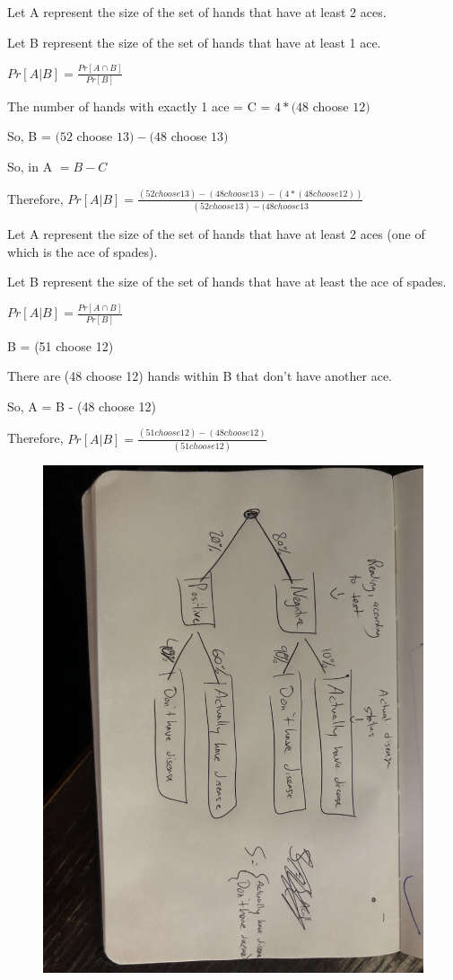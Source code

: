 \documentclass{6042}
\author{Ian Miller}
\begin{document}



Let A represent the size of the set of hands that have at least 2 aces.

Let B represent the size of the set of hands that have at least 1 ace.

$Pr[A | B] = \frac{Pr[A \cap B]}{Pr[B]}$

The number of hands with exactly 1 ace = C = $4 * (48$ choose $12)$

So, B = $(52$ choose $13) - (48$ choose $13)$

So, in A $ = B - C$

Therefore, $Pr[A | B] = \frac{(52 choose 13) - (48 choose 13) - (4 * (48 choose 12))}{(52 choose 13) - (48 choose 13}$





Let A represent the size of the set of hands that have at least 2 aces (one of which is the ace of spades).

Let B represent the size of the set of hands that have at least the ace of spades.

$Pr[A | B] = \frac{Pr[A \cap B]}{Pr[B]}$

B = (51 choose 12)

There are (48 choose 12) hands within B that don't have another ace.

So, A = B - (48 choose 12)

Therefore, $Pr[A | B] = \frac{(51 choose 12) - (48 choose 12)}{(51 choose 12)}$




\begin{figure}[h!]
    \includegraphics[width=0.6\linewidth]{prob2tree.jpg}

\end{figure}
\end{document}
